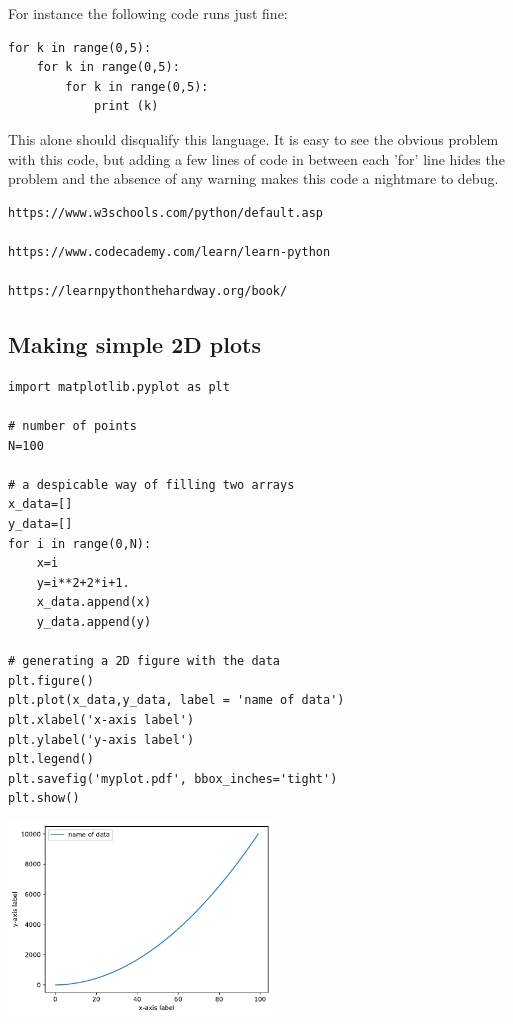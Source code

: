 For instance the following code runs just fine:

\begin{lstlisting}
for k in range(0,5): 
    for k in range(0,5):
        for k in range(0,5):
            print (k)
\end{lstlisting}

This alone should disqualify this language. It is easy to see the obvious problem with this code, but adding a few lines of code in between each 'for' line hides the problem and the absence of any warning makes this code a nightmare to debug.



\begin{verbatim}
https://www.w3schools.com/python/default.asp

https://www.codecademy.com/learn/learn-python

https://learnpythonthehardway.org/book/
\end{verbatim}

\subsection{Making simple 2D plots}

\begin{lstlisting}
import matplotlib.pyplot as plt

# number of points
N=100

# a despicable way of filling two arrays
x_data=[]
y_data=[]
for i in range(0,N):
    x=i
    y=i**2+2*i+1.
    x_data.append(x)
    y_data.append(y)

# generating a 2D figure with the data
plt.figure()
plt.plot(x_data,y_data, label = 'name of data')
plt.xlabel('x-axis label')
plt.ylabel('y-axis label')
plt.legend()
plt.savefig('myplot.pdf', bbox_inches='tight')
plt.show()
\end{lstlisting}

\begin{center}
\includegraphics[width=7cm]{images/python/myplot}
\end{center}



